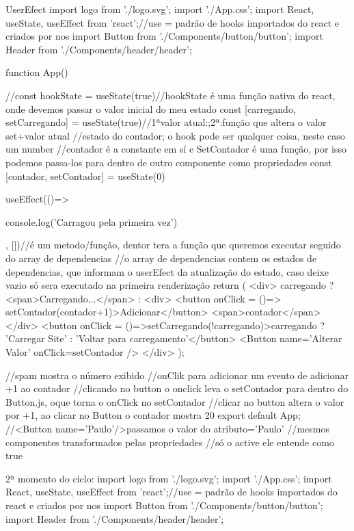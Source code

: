 UserEfect
import logo from './logo.svg';
import './App.css';
import React, { useState, useEffect } from 'react';//use = padrão de hooks importados do react e criados por nos
import Button from './Components/button/button';
import Header from './Components/header/header';


function App() {
 
  //const hookState = useState(true)//hookState é uma função nativa do react, onde devemos passar o valor inicial do meu estado
  const [carregando, setCarregando] = useState(true)//1ªvalor atual:;2ª:função que altera o valor set+valor atual
  //estado do contador; o hook pode ser qualquer coisa, neste caso um number
  //contador é a constante em sí e SetContador é uma função, por isso podemos passa-los para dentro de outro componente como propriedades
  const [contador, setContador] = useState(0)

  useEffect(()=>{
    console.log('Carragou pela primeira vez')

  }, [])//é um metodo/função, dentor tera a função que queremos executar seguido do array de dependencias
//o array de dependencias contem os estados de dependencias, que informam o userEfect da atualização do estado, caso deixe vazio só sera executado na primeira renderização
  return (
   <div>
    {carregando ? 
    <span>Carregando...</span> 
    :
    <div>
      <button onClick = {()=> setContador(contador+1)}>Adicionar</button>
      <span>{contador}</span>
    </div>
    }
    <button onClick = {()=>setCarregando(!carregando)}>{carregando ? 'Carregar Site' : 'Voltar para carregamento'}</button>
    <Button name='Alterar Valor' onClick={setContador} />
    </div>
  );
}
//spam mostra o número exibido
//onClik para adicionar um evento de adicionar +1 ao contador
//clicando no button o onclick leva o setContador para dentro do Button.js, oque torna o onClick no setContador
//clicar no button altera o valor por +1, ao clicar no Button o contador mostra 20 
export default App;
//<Button name='Paulo'/>passamos o valor do atributo='Paulo'
//mesmos componentes transformados pelas propriedades
//só o active ele entende como true

2ª momento do ciclo:
import logo from './logo.svg';
import './App.css';
import React, { useState, useEffect } from 'react';//use = padrão de hooks importados do react e criados por nos
import Button from './Components/button/button';
import Header from './Components/header/header';


